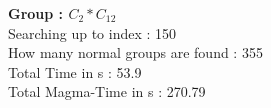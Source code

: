 \textbf{Group : $C_2*C_{12}$}\\
Searching up to index : 150\\
How many normal groups are found : 355\\
Total Time in s : 53.9\\
Total Magma-Time in s : 270.79\\
